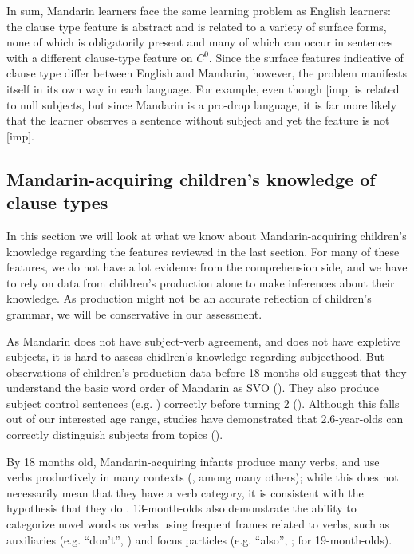 In sum, Mandarin learners face the same learning problem as English learners: the clause type feature is abstract and is related to a variety of surface forms, none of which is obligatorily present and many of which can occur in sentences with a different clause-type feature on $C^{0}$. Since the surface features indicative of clause type differ between English and Mandarin, however, the problem manifests itself in its own way in each language. For example, even though [imp] is related to null subjects, but since Mandarin is a pro-drop language, it is far more likely that the learner observes a sentence without subject and yet the feature is not [imp].  

\subsection{Mandarin-acquiring children's knowledge of clause types}
\label{sec:mancl:bg:child}
In this section we will look at what we know about Mandarin-acquiring children's knowledge regarding the features reviewed in the last section. For many of these features, we do not have a lot evidence from the comprehension side, and we have to rely on data from children's production alone to make inferences about their knowledge. As production might not be an accurate reflection of children's grammar, we will be conservative in our assessment.   

   As Mandarin does not have subject-verb agreement, and does not have expletive subjects, it is hard to assess chidlren's knowledge regarding subjecthood. But observations of children's production data before 18 months old suggest that they understand the basic word order of Mandarin as SVO (\cite{tardif1993verb,tardif1996verb}). They also produce subject control sentences (e.g. ) correctly before turning 2 (\cite{yang2015control}). Although this falls out of our interested age range, studies have demonstrated that 2.6-year-olds can correctly distinguish subjects from topics (\cite{chien1985subj}). 

 By 18 months old, Mandarin-acquiring infants produce many verbs, and use verbs productively in many contexts (\cite{tardif1993verb,tardif1996verb, xiaolee2006,zhangshili2015infant}, among many others); while this does not necessarily mean that they have a verb category, it is consistent with the hypothesis that they do . 13-month-olds also demonstrate the ability to categorize novel words as verbs using frequent frames related to verbs, such as auxiliaries (e.g.  ``don't'', \cite{zhang2015bie}) and focus particles (e.g.  ``also'', \cite{zhangshili2015infant}; \cite{ying2021func} for 19-month-olds).

